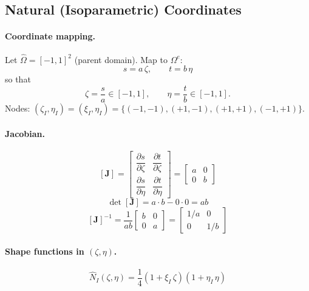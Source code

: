 \documentclass[11pt, a4paper]{article}
\begin{document}
\subsection{Natural (Isoparametric) Coordinates}\label{sec:natural}

\paragraph{Coordinate mapping.}
Let $\hat{\Omega}=[-1,1]^2$ (parent domain).  Map to $\Omega^e$:
\begin{equation}\label{eq:map}
s = a\,\zeta,\qquad t = b\,\eta
\end{equation}
so that
\[
\zeta=\frac{s}{a}\in[-1,1],\qquad \eta=\frac{t}{b}\in[-1,1].
\]
Nodes: $(\zeta_I,\eta_I)=(\xi_I,\eta_I)=\{(-1,-1),(+1,-1),(+1,+1),(-1,+1)\}$.

\paragraph{Jacobian.}
\begin{equation}\label{eq:J}
[\mathbf{J}]=
\begin{bmatrix}
\dfrac{\partial s}{\partial\zeta} & \dfrac{\partial t}{\partial\zeta} \\[10pt]
\dfrac{\partial s}{\partial\eta}  & \dfrac{\partial t}{\partial\eta}
\end{bmatrix}
=\begin{bmatrix} a & 0 \\ 0 & b \end{bmatrix}
\end{equation}
\begin{equation}\label{eq:detJ}
\det[\mathbf{J}]=a\cdot b - 0\cdot 0 = ab
\end{equation}
\begin{equation}\label{eq:Jinv}
[\mathbf{J}]^{-1}=\frac{1}{ab}\begin{bmatrix}b & 0\\0 & a\end{bmatrix}
=\begin{bmatrix}1/a & 0\\0 & 1/b\end{bmatrix}
\end{equation}

\paragraph{Shape functions in $(\zeta,\eta)$.}
\begin{equation}\label{eq:NI_nat}
\boxed{\hat{N}_I(\zeta,\eta)=\frac{1}{4}(1+\xi_I\,\zeta)(1+\eta_I\,\eta)}
\end{equation}
\end{document}
